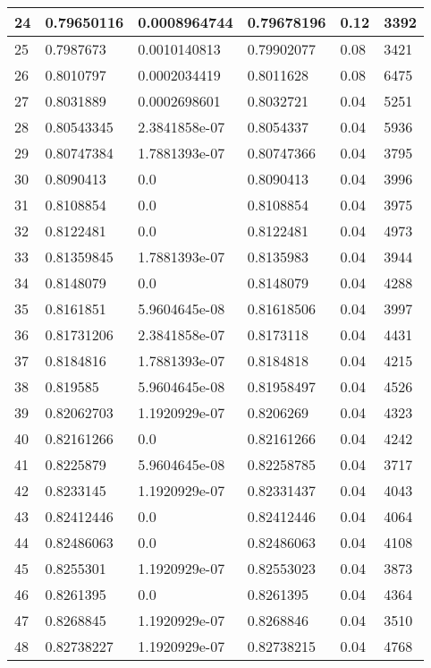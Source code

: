 \begin{longtable}{|l|l|l|l|l|l|}
24 & 0.79650116 & 0.0008964744 & 0.79678196 & 0.12 & 3392 \\ \hline 
25 & 0.7987673 & 0.0010140813 & 0.79902077 & 0.08 & 3421 \\ \hline 
26 & 0.8010797 & 0.0002034419 & 0.8011628 & 0.08 & 6475 \\ \hline 
27 & 0.8031889 & 0.0002698601 & 0.8032721 & 0.04 & 5251 \\ \hline 
28 & 0.80543345 & 2.3841858e-07 & 0.8054337 & 0.04 & 5936 \\ \hline 
29 & 0.80747384 & 1.7881393e-07 & 0.80747366 & 0.04 & 3795 \\ \hline 
30 & 0.8090413 & 0.0 & 0.8090413 & 0.04 & 3996 \\ \hline 
31 & 0.8108854 & 0.0 & 0.8108854 & 0.04 & 3975 \\ \hline 
32 & 0.8122481 & 0.0 & 0.8122481 & 0.04 & 4973 \\ \hline 
33 & 0.81359845 & 1.7881393e-07 & 0.8135983 & 0.04 & 3944 \\ \hline 
34 & 0.8148079 & 0.0 & 0.8148079 & 0.04 & 4288 \\ \hline 
35 & 0.8161851 & 5.9604645e-08 & 0.81618506 & 0.04 & 3997 \\ \hline 
36 & 0.81731206 & 2.3841858e-07 & 0.8173118 & 0.04 & 4431 \\ \hline 
37 & 0.8184816 & 1.7881393e-07 & 0.8184818 & 0.04 & 4215 \\ \hline 
38 & 0.819585 & 5.9604645e-08 & 0.81958497 & 0.04 & 4526 \\ \hline 
39 & 0.82062703 & 1.1920929e-07 & 0.8206269 & 0.04 & 4323 \\ \hline 
40 & 0.82161266 & 0.0 & 0.82161266 & 0.04 & 4242 \\ \hline 
41 & 0.8225879 & 5.9604645e-08 & 0.82258785 & 0.04 & 3717 \\ \hline 
42 & 0.8233145 & 1.1920929e-07 & 0.82331437 & 0.04 & 4043 \\ \hline 
43 & 0.82412446 & 0.0 & 0.82412446 & 0.04 & 4064 \\ \hline 
44 & 0.82486063 & 0.0 & 0.82486063 & 0.04 & 4108 \\ \hline 
45 & 0.8255301 & 1.1920929e-07 & 0.82553023 & 0.04 & 3873 \\ \hline 
46 & 0.8261395 & 0.0 & 0.8261395 & 0.04 & 4364 \\ \hline 
47 & 0.8268845 & 1.1920929e-07 & 0.8268846 & 0.04 & 3510 \\ \hline 
48 & 0.82738227 & 1.1920929e-07 & 0.82738215 & 0.04 & 4768 \\ \hline 

\end{longtable}

